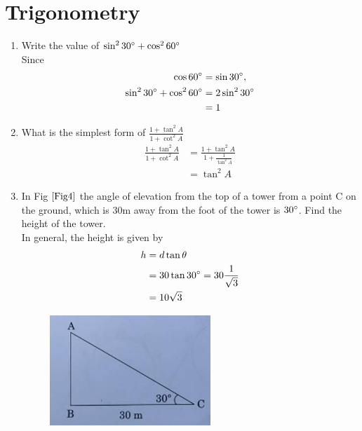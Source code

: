 \documentclass[journal,12pt,twocolumn]{IEEEtran}
\begin{document}
\section{Trigonometry}
\begin{enumerate}
\item Write the value of $\sin^2 30\degree + \cos^2 60\degree$\\
	\solution Since 
  \begin{align}
	  \cos 60\degree &= \sin 30\degree, 
	  \\
	  \sin^2 30\degree + \cos^2 60\degree &= 
2\sin^2 30\degree 
\\
	  &=1
  \end{align}
\item What is the simplest form of $\frac{1 + \tan^2 A}{1 + \cot^2 A}$\\
	\solution
		\begin{align}
			\frac{1 + \tan^2 A}{1 + \cot^2 A} 
			&=\frac{1 + \tan^2 A}{1 + \frac{1}{\tan^2 A}} 
			\\
			&=\tan^2 A
		\end{align}
\item In Fig $\ref{Fig4}$ the angle of elevation from the top of a tower from a point C on the ground, which is 30m away from the foot of the tower is $30\degree$. Find the height of the tower.\\
	\solution In general, the height is given by 
  \begin{align}
	  h &= d \tan \theta
	  \\
	  &= 30 \tan 30 \degree = 30 \frac{1}{\sqrt{3}}
	  \\
	  &= 10 \sqrt{3}
  \end{align}

\begin{figure}[h!]
    \centering
    \includegraphics[width=0.5\columnwidth]{Fig4.png}
	\caption{}
	\label{Fig4}
 \end{figure}


\end{enumerate}
\end{document}
